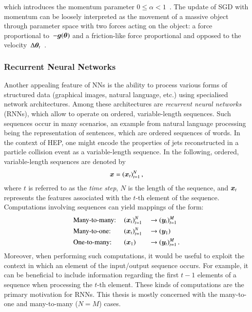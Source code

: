 which introduces the momentum parameter
$0 \leq \alpha < 1$~\cite{rumelhart1986learning,Goodfellow-et-al-2016}. The
update of SGD with momentum can be loosely interpreted as the movement of a
massive object through parameter space with two forces acting on the object: a
force proportional to~$-\bm{g}(\bm{\theta})$ and a friction-like force
proportional and opposed to the
velocity~$\Delta\bm{\theta}_{t}$~\cite{Goodfellow-et-al-2016}.


\subsubsection{Recurrent Neural Networks}%
\label{sec:rnn}

Another appealing feature of NNs is the ability to process various forms of
structured data (graphical images, natural language, etc.) using specialised
network architectures. Among these architectures are \emph{recurrent neural
  networks} (RNNs), which allow to operate on ordered, variable-length
sequences. Such sequences occur in many scenarios, an example from natural
language processing being the representation of sentences, which are ordered
sequences of words. In the context of HEP, one might encode the properties of
jets reconstructed in a particle collision event as a variable-length
sequence. In the following, ordered, variable-length sequences are denoted by
\begin{align*}
  \bm{x} = (\bm{x}_{t})_{t = 1}^{N} \,\text{,}
\end{align*}
where $t$ is referred to as the \emph{time step}, $N$ is the length of the
sequence, and $\bm{x}_{t}$ represents the features associated with the $t$-th
element of the sequence. Computations involving sequences can yield mappings of
the form:
\begin{alignat*}{3}
  &\text{Many-to-many:}\,
  &&(\bm{x}_{t})_{t = 1}^{N} &&\rightarrow (\bm{y}_{t})_{t = 1}^{M} \\
  &\text{Many-to-one:}\,
  &&(\bm{x}_{t})_{t = 1}^{N} &&\rightarrow (\bm{y}_{1}) \\
  &\text{One-to-many:}\,
  &&(\bm{x}_1)              &&\rightarrow (\bm{y}_{t})_{t = 1}^{M} \,\text{.}
\end{alignat*}
Moreover, when performing such computations, it would be useful to exploit the
context in which an element of the input/output sequence occurs. For example, it
can be beneficial to include information regarding the first $t - 1$ elements of
a sequence when processing the $t$-th element. These kinds of computations are
the primary motivation for RNNs. This thesis is mostly concerned with the
many-to-one and many-to-many ($N = M$) cases.

